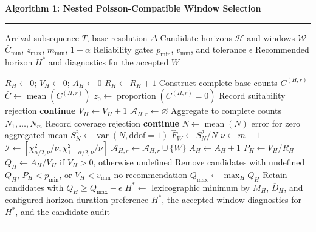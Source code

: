 \documentclass[border=12pt,varwidth=700pt]{standalone}
\begin{document}
\noindent\textbf{Algorithm 1: Nested Poisson-Compatible Window Selection}\par
\smallskip
\hrule
\smallskip
\begin{algorithmic}[1]
\Require Arrival subsequence $T$, base resolution $\Delta$
\Require Candidate horizons $\mathcal H$ and windows $\mathcal W$
\Require $\bar C_{\min}$, $z_{\max}$, $m_{\min}$, $1-\alpha$
\Require Reliability gates $p_{\min}$, $v_{\min}$, and tolerance $\epsilon$
\Ensure Recommended horizon $H^*$ and diagnostics for the accepted $W$

    \State $R_H\gets0$; $V_H\gets0$; $A_H\gets0$
        \State $R_H\gets R_H+1$
        \State Construct complete base counts $C^{(H,r)}$
        \State $\bar C\gets\operatorname{mean}(C^{(H,r)})$
        \State $z_0\gets\operatorname{proportion}(C^{(H,r)}=0)$
            \State Record suitability rejection
            \State \textbf{continue}
        \EndIf
        \State $V_H\gets V_H+1$
        \State $\mathcal A_{H,r}\gets\varnothing$
            \State Aggregate to complete counts $N_1,\ldots,N_m$
                \State Record coverage rejection
                \State \textbf{continue}
            \EndIf
            \State $\bar N\gets\operatorname{mean}(N)$
                \State \Return error for zero aggregated mean
            \EndIf
            \State $S_N^2\gets\operatorname{var}(N,\mathrm{ddof}=1)$
            \State $\widehat F_W\gets S_N^2/\bar N$
            \State $\nu\gets m-1$
            \State $\mathcal I\gets[\chi^2_{\alpha/2,\nu}/\nu,
                   \chi^2_{1-\alpha/2,\nu}/\nu]$
                \State $\mathcal A_{H,r}\gets\mathcal A_{H,r}\cup\{W\}$
            \EndIf
        \EndFor
            \State $A_H\gets A_H+1$
        \EndIf
    \EndFor
    \State $P_H\gets V_H/R_H$
    \State $Q_H\gets A_H/V_H$ if $V_H>0$, otherwise undefined
\EndFor
\State Remove candidates with undefined $Q_H$, $P_H<p_{\min}$, or $V_H<v_{\min}$
    \State \Return no recommendation
\EndIf
\State $Q_{\max}\gets\max_H Q_H$
\State Retain candidates with $Q_H\ge Q_{\max}-\epsilon$
\State $H^*\gets$ lexicographic minimum by $M_H$, $\overline D_H$, and
       configured horizon-duration preference
\State \Return $H^*$, the accepted-window diagnostics for $H^*$, and the
       candidate audit
\end{algorithmic}
\hrule
\end{document}

